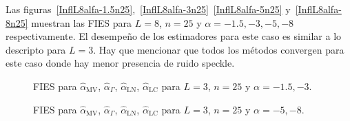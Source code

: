 Las figuras~\ref{InflL8alfa-1.5n25},~\ref{InflL8alfa-3n25}~\ref{InflL8alfa-5n25} y~\ref{InflL8alfa-8n25} muestran las FIES para $L=8$, $n=25$ y $\alpha=-1.5, -3, -5, -8$ respectivamente. El desempeño de los estimadores para este caso es similar a lo descripto para $L=3$. Hay que mencionar que todos los métodos convergen para este caso donde hay menor presencia de ruido speckle. 

\begin{figure}[htb]
	\caption{\label{InflL3n25}\small FIES para $\widehat{\alpha}_{\text{MV}}$, $\widehat{\alpha}_{\Gamma}$, $\widehat{\alpha}_{\text{LN}}$, $\widehat{\alpha}_{\text{LC}}$ para $L=3$, $n=25$ y $\alpha=-1.5,-3$.}
\end{figure}

\begin{figure}[htb]
	\caption{\label{InflL3n25}\small FIES para $\widehat{\alpha}_{\text{MV}}$, $\widehat{\alpha}_{\Gamma}$, $\widehat{\alpha}_{\text{LN}}$, $\widehat{\alpha}_{\text{LC}}$ para $L=3$, $n=25$ y $\alpha=-5,-8$.}
\end{figure}

